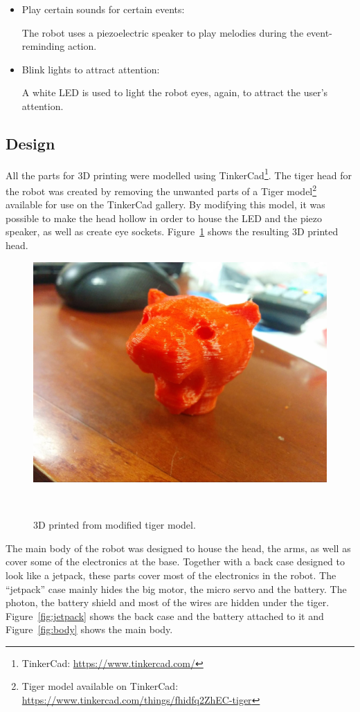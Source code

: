 \documentclass{sigchi-ext}
\begin{document}
\begin{itemize}
\item Play certain sounds for certain events:

  The robot uses a piezoelectric speaker to play melodies during the
  event-reminding action.

\item Blink lights to attract attention:

  A white LED is used to light the robot eyes, again, to attract the user's
  attention.

\end{itemize}


\subsection{Design}

All the parts for 3D printing were modelled using TinkerCad\footnote{TinkerCad:
  \url{https://www.tinkercad.com/}}. The tiger head for the robot was created by
removing the unwanted parts of a Tiger model\footnote{Tiger model available on
  TinkerCad: \url{https://www.tinkercad.com/things/fhidfq2ZhEC-tiger}} available for
use on the TinkerCad gallery. By modifying this model, it was possible to make
the head hollow in order to house the LED and the piezo speaker, as well as
create eye sockets. Figure~\ref{fig:head} shows the resulting 3D printed head.

\begin{figure}
  \includegraphics[width=0.9\columnwidth]{../photos/head}
  \caption{3D printed from modified tiger model.}~\label{fig:head}
\end{figure}

The main body of the robot was designed to house the head, the arms, as well as
cover some of the electronics at the base. Together with a back case designed
to look like a jetpack, these parts cover most of the electronics in the robot.
The ``jetpack'' case mainly hides the big motor, the micro servo and the battery.
The photon, the battery shield and most of the wires are hidden under the
tiger. Figure~\ref{fig:jetpack} shows the back case and the battery attached to
it and Figure~\ref{fig:body} shows the main body.
\end{document}
